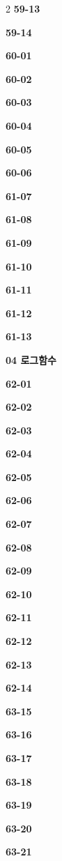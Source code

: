 \documentclass[10pt,a4paper]{article}
\begin{document}
\begin{multicols}{2}
\noindent\textbf{59-13}\ \par
\noindent\textbf{59-14}\ \par
\noindent\textbf{60-01}\ \par
\noindent\textbf{60-02}\ \par
\noindent\textbf{60-03}\ \par
\noindent\textbf{60-04}\ \par
\noindent\textbf{60-05}\ \par
\noindent\textbf{60-06}\ \par
\noindent\textbf{61-07}\ \par
\noindent\textbf{61-08}\ \par
\noindent\textbf{61-09}\ \par
\noindent\textbf{61-10}\ \par
\noindent\textbf{61-11}\ \par
\noindent\textbf{61-12}\ \par
\noindent\textbf{61-13}\ \par
\noindent\textbf{04 로그함수}\par\smallskip
\noindent\textbf{62-01}\ \par
\noindent\textbf{62-02}\ \par
\noindent\textbf{62-03}\ \par
\noindent\textbf{62-04}\ \par
\noindent\textbf{62-05}\ \par
\noindent\textbf{62-06}\ \par
\noindent\textbf{62-07}\ \par
\noindent\textbf{62-08}\ \par
\noindent\textbf{62-09}\ \par
\noindent\textbf{62-10}\ \par
\noindent\textbf{62-11}\ \par
\noindent\textbf{62-12}\ \par
\noindent\textbf{62-13}\ \par
\noindent\textbf{62-14}\ \par
\noindent\textbf{63-15}\ \par
\noindent\textbf{63-16}\ \par
\noindent\textbf{63-17}\ \par
\noindent\textbf{63-18}\ \par
\noindent\textbf{63-19}\ \par
\noindent\textbf{63-20}\ \par
\noindent\textbf{63-21}\ \par

\end{multicols}
\end{document}
